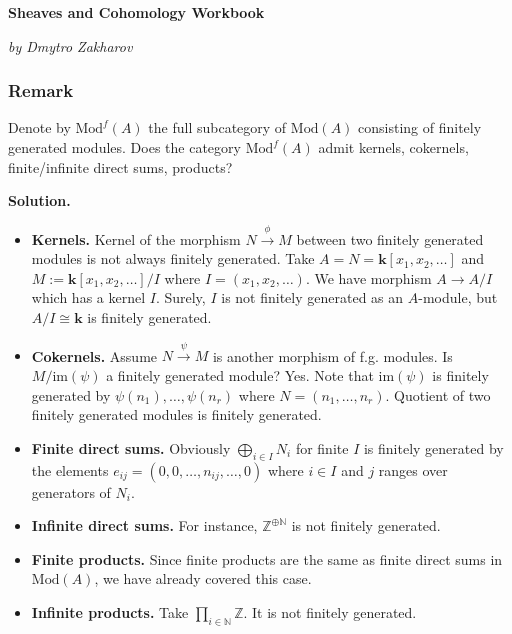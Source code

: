 \documentclass{category-template}
\begin{document}
\begin{center}
    \textbf{\Huge{Sheaves and Cohomology Workbook}}

    \textit{by Dmytro Zakharov}
\end{center}

\subsubsection*{Remark}

\begin{problem}
    Denote by $\text{Mod}^f(A)$ the full subcategory of 
    $\text{Mod}(A)$ consisting of finitely generated modules.
    Does the category $\text{Mod}^f(A)$ admit kernels,
    cokernels, finite/infinite direct sums, products?
\end{problem}

\textbf{Solution.} 

\begin{itemize}
    \item \textbf{Kernels.} Kernel of the morphism $N \xrightarrow{\phi} M$
    between two finitely generated modules is not always finitely generated.
    Take $A=N=\mathbf{k}[x_1,x_2,\dots]$ and $M := \mathbf{k}[x_1,x_2,\dots]/I$
    where $I=(x_1,x_2,\dots)$. We have morphism $A \to A/I$ which has a kernel
    $I$. Surely, $I$ is not finitely generated as an $A$-module, but $A/I \cong
    \mathbf{k}$ is finitely generated.
    \item \textbf{Cokernels.} Assume $N \xrightarrow{\psi} M$ is another
    morphism of f.g. modules. Is $M/\text{im}(\psi)$ a finitely generated
    module? Yes. Note that $\text{im}(\psi)$ is finitely generated by
    $\psi(n_1),\dots,\psi(n_r)$ where $N=(n_1,\dots,n_r)$. Quotient of two
    finitely generated modules is finitely generated.
    \item \textbf{Finite direct sums.} Obviously $\bigoplus_{i \in I}N_i$ for
    finite $I$ is finitely generated by the elements
    $e_{ij}=(0,0,\dots,n_{ij},\dots,0)$ where $i \in I$ and $j$ ranges over
    generators of $N_i$.
    \item \textbf{Infinite direct sums.} For instance,
    $\mathbb{Z}^{\oplus\mathbb{N}}$ is not finitely generated.
    \item \textbf{Finite products.} Since finite products are the same as finite
    direct sums in $\text{Mod}(A)$, we have already covered this case.
    \item \textbf{Infinite products.} Take $\prod_{i \in \mathbb{N}}\mathbb{Z}$.
    It is not finitely generated.
\end{itemize}
\end{document}
